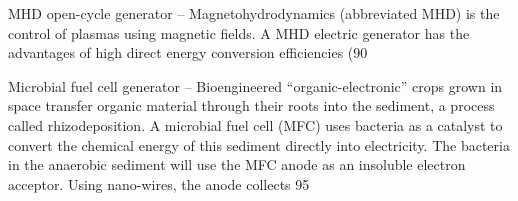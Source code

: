 \documentclass[a4paper]{book}
\begin{document}
MHD open-cycle generator – Magnetohydrodynamics (abbreviated MHD) is the control of plasmas using magnetic fields. A MHD electric generator has the advantages of high direct energy conversion efficiencies (90%
 
Microbial fuel cell generator – Bioengineered “organic-electronic” crops grown in space transfer organic material through their roots into the sediment, a process called rhizodeposition. A microbial fuel cell (MFC) uses bacteria as a catalyst to convert the chemical energy of this sediment directly into electricity. The bacteria in the anaerobic sediment will use the MFC anode as an insoluble electron acceptor. Using nano-wires, the anode collects 95%
 
\end{document}
